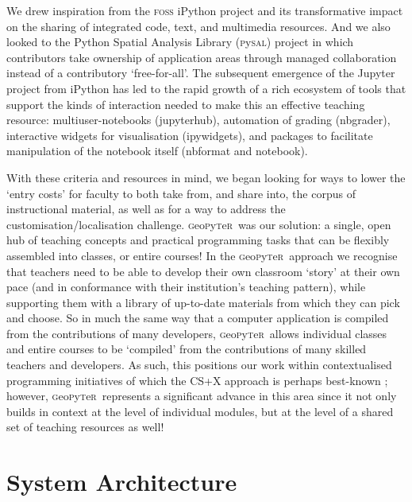 \documentclass[letter, 11pt,titlepage]{article}
\newcommand{\gp}{\textsc{g}eo\textsc{p}y\textsc{t}e\textsc{r}~\/}
\newcommand{\eg}{e.g.~\/}
\begin{document}
We drew inspiration from the \textsc{foss} iPython project
\citep{perez_2007_ipython} and its transformative impact on the sharing of
integrated code, text, and multimedia resources. And we also looked to the
Python Spatial Analysis Library (\textsc{p}y\textsc{sal}) project
\cite{rey_19sea}in which contributors take ownership of application areas
through managed collaboration instead of a contributory `free-for-all'. The
subsequent emergence of the Jupyter project \cite{kluyver16} from iPython has
led to the rapid growth of a rich ecosystem of tools that support the kinds of
interaction needed to make this an effective teaching resource:
multiuser-notebooks (jupyterhub), automation of grading (nbgrader), interactive
widgets for visualisation (ipywidgets), and packages to facilitate manipulation
of the notebook itself (nbformat and notebook).

With these criteria and resources in mind, we began looking for ways to lower
the `entry costs' for faculty to both take from, and share into, the corpus of
instructional material, as well as for a way to address the
customisation/localisation challenge. \gp was our solution: a single, open hub
of teaching concepts and practical programming tasks that can be flexibly
assembled into classes, or entire courses! In the \gp approach we recognise that
teachers need to be able to develop their own classroom `story' at their own
pace (and in conformance with their institution's teaching pattern), while
supporting them with a library of up-to-date materials from which they can pick
and choose. So in much the same way that a computer application is compiled from
the contributions of many developers, \gp allows individual classes and entire
courses to be `compiled' from the contributions of many skilled teachers and
developers. As such, this positions our work within contextualised programming initiatives \citep{Guzdial2010,Lukkarinen2016} of which the CS+X approach is perhaps best-known \citep[][\eg]{Mir2017}; however, \gp represents a significant advance in this area since it not only builds in context at the level of individual modules, but at the level of a shared set of teaching resources as well!

\section{System Architecture}\label{system-architecture}
\end{document}
